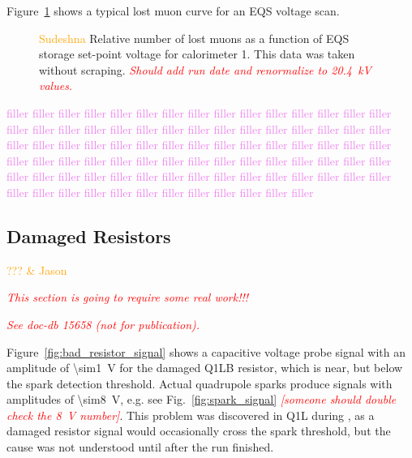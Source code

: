 Figure~\ref{fig:lost_muon_scan} shows a typical lost muon curve for an EQS voltage scan. 
\begin{figure}[]
	\centering
	\caption{\textcolor{orange}{Sudeshna} Relative number of lost muons as a function of EQS storage set-point voltage for calorimeter 1. This data was taken without scraping. \textcolor{red}{\textit{Should add run date and renormalize to \SI{20.4}{\kilo\volt} values.}}}\label{fig:lost_muon_scan}
\end{figure}

\textcolor{violet}{filler filler filler filler filler filler filler filler filler filler filler filler filler filler filler filler filler filler filler filler filler filler filler filler filler filler filler filler filler filler filler filler filler filler filler filler filler filler filler filler filler filler filler filler filler filler filler filler filler filler filler filler filler filler filler filler filler filler filler filler filler filler filler filler filler filler filler filler filler filler filler filler filler filler filler filler filler filler filler filler filler filler filler filler filler filler filler}

\subsection{\label{sec:damaged_res} Damaged Resistors}
\textcolor{orange}{??? \& Jason}
\medskip

\textcolor{red}{\textit{This section is going to require some real work!!!}}

\medskip
\textcolor{red}{\textit{See doc-db 15658 (not for publication).}}
\medskip

Figure~\ref{fig:bad_resistor_signal} shows a capacitive voltage probe signal with an amplitude of \SI{\sim1}{\volt} for the damaged Q1LB resistor, which is near, but below the spark detection threshold. Actual quadrupole sparks produce signals with amplitudes of \SI{\sim8}{\volt}, e.g. see Fig.~\ref{fig:spark_signal} \textcolor{red}{\textit{[someone should double check the \SI{8}{\volt} number]}}. This problem was discovered in Q1L during \runone, as a damaged resistor signal would occasionally cross the spark threshold, but the cause was not understood until after the run finished.

